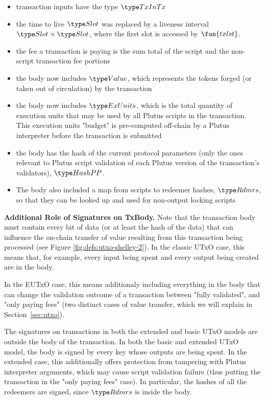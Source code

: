 \begin{itemize}
  \item transaction inputs have the type $\TxInTx$
  \item the
  time to live $\Slot$ was replaced by a liveness interval $\Slot \times \Slot$,
  where the first slot is accessed by $\fun{txlst}$.
  \item the fee a transaction is paying is the sum total of the script and the
  non-script transaction fee portions
  \item the body now includes $\Value$, which represents
  the tokens forged (or taken out of circulation) by the transaction
  \item the body now includes $\ExUnits$, which is the total quantity of execution units
  that may be used by all Plutus scripts in the transaction.
  This execution units "budget" is pre-computed off-chain by a Plutus interpreter
  before the transaction is submitted
  \item the body has the hash of the current protocol parameters
  (only the ones relevant to Plutus script validation of each Plutus
  version of the transaction's validators), $\HashPP$.
  \item The body also included a map from scripts to redeemer hashes, $\Rdmrs$,
  so that they can be looked up and used for non-output locking scripts
\end{itemize}

\textbf{Additional Role of Signatures on TxBody.}
Note that the transaction body must contain every bit of data
(or at least the hash of the data) that can influence the
on-chain transfer of value resulting from this transaction being processed
(see Figure \ref{fig:defs:utxo-shelley-2}).
In the classic UTxO case, this means that, for example,
every input being spent and every output being created are in the body.

In the EUTxO case, this means additionaly including everything in the body that can change
the validation outcome of a transaction between "fully validated", and "only
paying fees" (two distinct cases of value transfer, which
we will explain in Section~\ref{sec:utxo}).

The signatures on transactions in both the extended and basic UTxO models
are outside the body of the transaction.
In both the basic and extended UTxO model, the body is signed by every key
whose outputs are being spent. In the extended case, this additionally offers
protection from tampering with Plutus interpreter arguments, which may cause
script validation failure (thus putting the transaction in the "only paying fees" case).
In particular, the hashes of all the redeemers are signed, since $\Rdmrs$ is inside
  the body.


